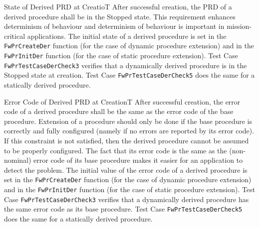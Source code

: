 \documentclass[requirements]{../fwprofile}
\begin{document}
\begin{fw_req}{State of Derived PRD at Creatio}{T}
{After successful creation, the PRD of a derived procedure shall be in the Stopped state.}
{This requirement enhances determinism of behaviour and determinism of behaviour is important in mission-critical applications.}
{The initial state of a derived procedure is set in the \texttt{FwPrCreateDer} function (for the case of dynamic procedure 
extension) and in the \texttt{FwPrInitDer} function (for the case of static procedure extension).} 
{Test Case \texttt{FwPrTestCaseDerCheck3} verifies that a dynamically 
derived procedure is in the Stopped state at creation.
Test Case \texttt{FwPrTestCaseDerCheck5} does the same for a statically derived procedure.}
\end{fw_req}


\begin{fw_req}{Error Code of Derived PRD at Creation}{T}
{After successful creation, the error code of a derived procedure shall be the same as the error code of the base procedure.}
{Extension of a procedure should only be done if the base procedure is correctly and fully configured (namely if no errors are reported by its error code). 
If this constraint is not satisfied, then the derived procedure cannot be assumed to be properly configured. 
The fact that its error code is the same as the (non-nominal) error code of its base procedure makes it easier for an application to detect the problem.}
{The initial value of the error code of a derived procedure is set in the \texttt{FwPrCreateDer} function (for the case of dynamic procedure extension) and in the \texttt{FwPrInitDer} function (for the case of static procedure extension).} 
{Test Case \texttt{FwPrTestCaseDerCheck3} verifies that a dynamically 
derived procedure has the same error code as its base procedure.
Test Case \texttt{FwPrTestCaseDerCheck5} does the same for a statically derived procedure.}
\end{fw_req}
\end{document}
